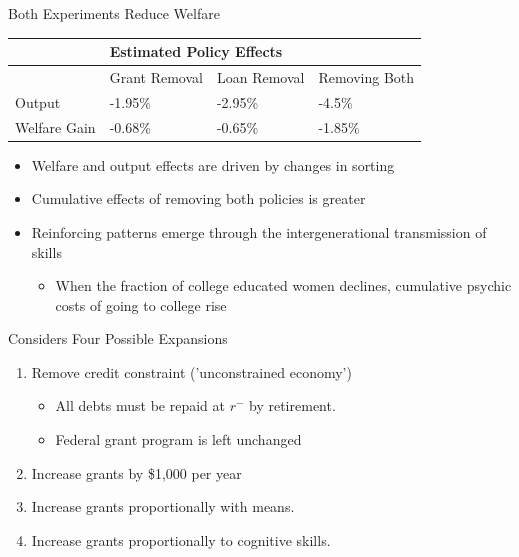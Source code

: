 \documentclass{beamer}
\begin{document}
\begin{frame}{Both Experiments Reduce Welfare}

\begin{table}[]
\centering
\label{my-label}
\begin{tabular}{|l|l|l|l|}
\hline
                 & \multicolumn{3}{l|}{Estimated Policy Effects} \\ \hline
                 & Grant Removal      & Loan Removal & Removing Both    \\ \hline
Output & -1.95\%                & -2.95\%          & -4.5\%    \\ \hline
Welfare Gain     & -0.68\%                & -0.65\%           & -1.85\%   \\ \hline
\end{tabular}
\end{table}

\begin{itemize}
\item Welfare and output effects are driven by changes in sorting \\[2mm]
\item Cumulative effects of removing both policies is greater
\item Reinforcing patterns emerge through the intergenerational transmission of skills \\[2mm]
\begin{itemize}
\item When the fraction of college educated women declines, cumulative psychic costs of going to college rise
\end{itemize}
\end{itemize}
\end{frame}

\begin{frame}{Considers Four Possible Expansions}
\begin{enumerate}
\item Remove credit constraint ('unconstrained economy')
\begin{itemize}
\item All debts must be repaid at $r^{-}$ by retirement.
\item Federal grant program is left unchanged \\[5mm]
\end{itemize}
\item Increase grants by \$1,000 per year \\[5mm]
\item Increase grants proportionally with means. \\[5mm]
\item Increase grants proportionally to cognitive skills. \\[5mm] 
\end{enumerate}
\end{frame}
\end{document}
